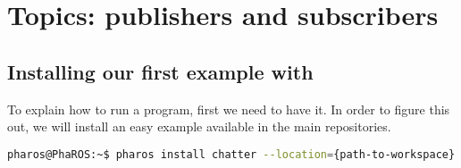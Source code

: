 \documentclass[a4paper,10pt,twoside]{book}
\begin{document}
\fi
\sloppy
\chapter{Topics: publishers and subscribers}
			
			
			
		\section{Installing our first example with \installationTool{}} 
			
			
			To explain how to run a \fwkName{} program, first we need to have it. In order to figure this out, we will install an easy example available in the main \fwkName{} repositories. 
			
			
			\begin{lstlisting}[language=bash,title={Installing chatter}]
				pharos@PhaROS:~$ pharos install chatter --location={path-to-workspace} --ros-distribution={fuerte | groovy | hydro}
			\end{lstlisting}
			
			
			
\end{document}
